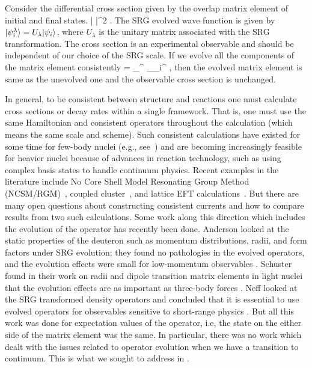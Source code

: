 	Consider the differential cross section given by the overlap matrix element
	of initial and final states.
	\beq
	 \propto \left|
	 \right|^2 \;.
	\eeq
	The SRG evolved wave function is given by ${|\psi_i^\lambda\rangle} =
	U_{\lambda} {|\psi_i\rangle}$, where $U_{\lambda}$ is the unitary matrix
	associated with the SRG transformation.  The cross section is an
	experimental observable and should be independent of our choice of
	the SRG scale.  If we evolve all the components
	of the matrix element consistently
	\beq
	 = 
	{_{^\lambda}}
	{_{\psi_i^{\lambda}}} \;,
	\label{eq:matrix_element_invariance}
	\eeq
	then the evolved matrix element is same as the unevolved one and the
	observable cross section is unchanged.

	In general, to be consistent between structure and reactions one must
	calculate	cross sections or decay rates within a single framework.
	That is, one must	use
	the same Hamiltonian and consistent operators throughout the calculation
	(which means the same scale and scheme).  Such consistent calculations have
	existed	for some time for few-body nuclei (e.g.,
	see~\cite{Epelbaum:2008ga,Hammer:2012id,Carlson:2014vla,Marcucci:2015rca})
	and	are becoming increasingly feasible for heavier nuclei because of advances
	in reaction technology, such as using complex basis states to handle
	continuum	physics.  Recent examples in the literature include
	No Core Shell Model Resonating Group Method
	(NCSM/RGM)~\cite{Quaglioni:2015via}, coupled cluster~\cite{Bacca:2013dma},
	and lattice EFT calculations~\cite{Pine:2013zja}.
	But there are many open	questions about constructing consistent currents and
	how to compare results from two such calculations.
	Some work along this direction which includes the evolution of the operator
	has recently been done.  Anderson \etal looked at the static properties
	of the deuteron such as momentum distributions, radii, and form factors under
	SRG evolution; they found no pathologies in the evolved operators, and
	the evolution effects were small for low-momentum observables
	\cite{Anderson:2010aq}.  Schuster \etal found in their work on radii and
	dipole transition matrix elements in light nuclei that the evolution effects
	are as important as three-body forces
	\cite{Schuster:2014lga,Schuster:2013sda}.
	Neff \etal looked at the SRG transformed density operators and concluded that
	it is essential to use evolved operators for observables sensitive to
	short-range physics \cite{Neff:2015xda}.  But all this work was done for
	expectation values of the operator, i.e, the state on the either side of the
	matrix element was the same.  In particular, there was no work which dealt
	with the issues related to operator evolution when we have a transition to
	continuum.  This is what we sought to address in \cite{More:2015tpa}.

